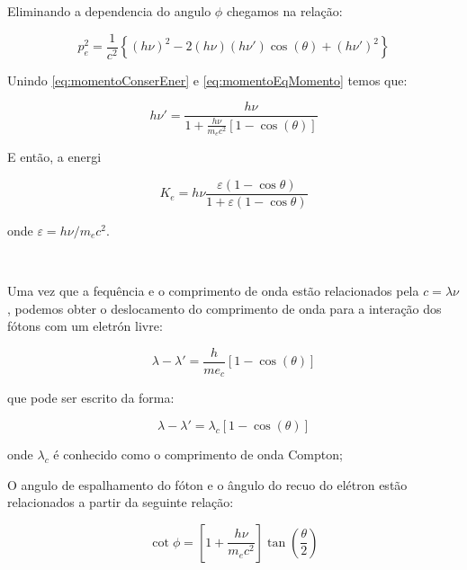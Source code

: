 \documentclass[11pt,a4paper]{article}
\begin{document}
    \noindent Eliminando a dependencia do angulo $\phi$ chegamos na relação:

            \begin{equation}
                p_e^2 = \frac{1}{c^2} \left\{ (h\nu)^2 - 2 (h\nu)(h\nu')\cos(\theta)+  (h\nu')^2\right\}
                \label{eq:momentoEqMomento}
            \end{equation}

    \noindent Unindo \ref{eq:momentoConserEner} e \ref{eq:momentoEqMomento} temos que:

                \begin{equation}
                    h\nu' = \frac{h\nu}{1 + \frac{h\nu}{m_ec^2}[1 - \cos(\theta)]}
                \end{equation}

    \noindent E então, a energi
            
                \begin{equation}
                    K_e = h\nu \frac{\varepsilon (1 - \cos \theta)}{1 + \varepsilon (1 - \cos \theta)}
                \end{equation}

    \noindent onde $\varepsilon = h\nu/m_e c^2$.

            \

    \noindent Uma vez que a fequência e o comprimento de onda estão relacionados pela  $c = \lambda \nu$, podemos obter o deslocamento do comprimento de onda para a interação dos fótons com um eletrón livre:

                \begin{equation}
                    \lambda - \lambda' = \frac{h}{me_c}[1 - \cos(\theta)]
                \end{equation}

    \noindent que pode ser escrito da forma:

                \begin{equation}
                    \lambda - \lambda' = \lambda_c[1 - \cos(\theta)]
                \end{equation}

    \noindent onde $\lambda_c$ é conhecido como o comprimento de onda Compton;


    \noindent O angulo de espalhamento do fóton e o ângulo do recuo do elétron estão relacionados a partir da seguinte relação:

                \begin{equation}
                    \cot \phi = \left[1 + \frac{h\nu}{m_ec^2} \right]\tan \left(\frac{\theta}{2}\right)
                \end{equation}
\end{document}
